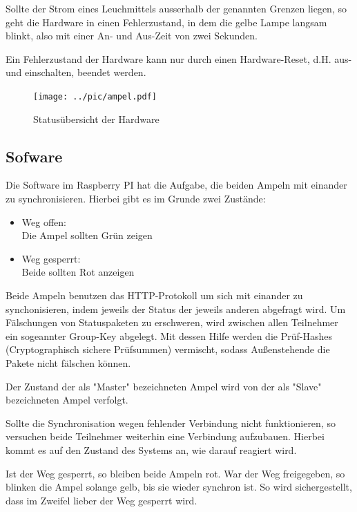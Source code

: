 \documentclass[a4paper, ngerman]{scrartcl}
\begin{document}
Sollte der Strom eines Leuchmittels ausserhalb der genannten Grenzen liegen, so geht die Hardware in einen Fehlerzustand, in dem die gelbe Lampe langsam blinkt, also mit einer An- und Aus-Zeit von zwei Sekunden.

Ein Fehlerzustand der Hardware kann nur durch einen Hardware-Reset, d.H. aus- und einschalten, beendet werden.

\begin{figure}
	\texttt{[image: ../pic/ampel.pdf]}
	\caption{Statusübersicht der Hardware}
\end{figure}

\subsection{Sofware}
Die Software im Raspberry PI hat die Aufgabe, die beiden Ampeln mit einander zu synchronisieren. Hierbei gibt es im Grunde zwei Zustände:
\begin{itemize}
	\item Weg offen:\\
		Die Ampel sollten Grün zeigen
	\item Weg gesperrt:\\
		Beide sollten Rot anzeigen
\end{itemize}

Beide Ampeln benutzen das HTTP-Protokoll um sich mit einander zu synchonisieren, indem jeweils der Status der jeweils anderen abgefragt wird. Um Fälschungen von Statuspaketen zu erschweren, wird zwischen allen Teilnehmer ein sogeannter Group-Key abgelegt. Mit dessen Hilfe werden die Prüf-Hashes (Cryptographisch sichere Prüfsummen) vermischt, sodass Außenstehende die Pakete nicht fälschen können.

Der Zustand der als "Master" bezeichneten Ampel wird von der als "Slave" bezeichneten Ampel verfolgt. 

Sollte die Synchronisation wegen fehlender Verbindung nicht funktionieren, so versuchen beide Teilnehmer weiterhin eine Verbindung aufzubauen. Hierbei kommt es auf den Zustand des Systems an, wie darauf reagiert wird.

Ist der Weg gesperrt, so bleiben beide Ampeln rot. War der Weg freigegeben, so blinken die Ampel solange gelb, bis sie wieder synchron ist. So wird sichergestellt, dass im Zweifel lieber der Weg gesperrt wird.
\end{document}
